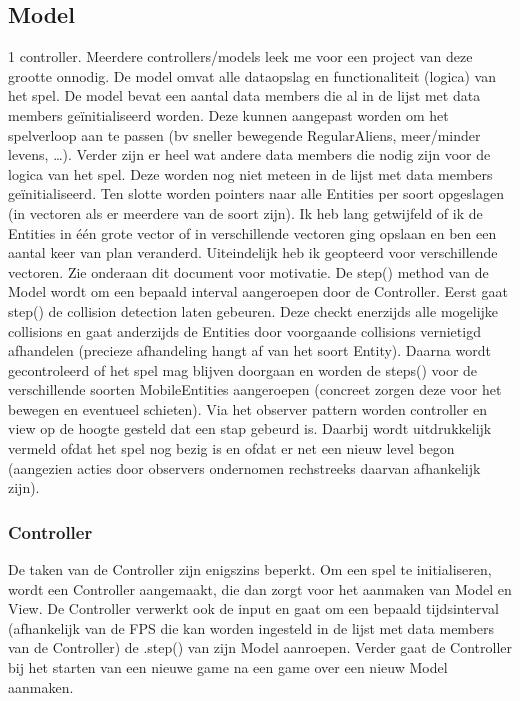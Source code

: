 \documentclass[11pt, a4paper]{article}
\begin{document}
\subsection{Model}
1 controller. Meerdere controllers/models leek me voor een project van deze grootte onnodig.
De model omvat alle dataopslag en functionaliteit (logica) van het spel. De model bevat een aantal data members die al in de lijst met data members geïnitialiseerd worden. Deze kunnen aangepast worden om het spelverloop aan te passen (bv sneller bewegende RegularAliens, meer/minder levens, …). Verder zijn er heel wat andere data members die nodig zijn voor de logica van het spel. Deze worden nog niet meteen in de lijst met data members geïnitialiseerd. Ten slotte worden pointers naar alle Entities per soort opgeslagen (in vectoren als er meerdere van de soort zijn). Ik heb lang getwijfeld of ik de Entities in één grote vector of in verschillende vectoren ging opslaan en ben een aantal keer van plan veranderd. Uiteindelijk heb ik geopteerd voor verschillende vectoren. Zie onderaan dit document voor motivatie.
De step() method van de Model wordt om een bepaald interval aangeroepen door de Controller. Eerst gaat step() de collision detection laten gebeuren. Deze checkt enerzijds alle mogelijke collisions en gaat anderzijds de Entities door voorgaande collisions vernietigd afhandelen (precieze afhandeling hangt af van het soort Entity). Daarna wordt gecontroleerd of het spel mag blijven doorgaan en worden de steps() voor de verschillende soorten MobileEntities aangeroepen (concreet zorgen deze voor het bewegen en eventueel schieten). Via het observer pattern worden controller en view op de hoogte gesteld dat een stap gebeurd is. Daarbij wordt uitdrukkelijk vermeld ofdat het spel nog bezig is en ofdat er net een nieuw level begon (aangezien acties door observers ondernomen rechstreeks daarvan afhankelijk zijn).
\subsubsection{Controller}
De taken van de Controller zijn enigszins beperkt. Om een spel te initialiseren, wordt een Controller aangemaakt, die dan zorgt voor het aanmaken van Model en View. De Controller verwerkt ook de input en gaat om een bepaald tijdsinterval (afhankelijk van de FPS die kan worden ingesteld in de lijst met data members van de Controller) de .step() van zijn Model aanroepen. Verder gaat de Controller bij het starten van een nieuwe game na een game over een nieuw Model aanmaken.
\end{document}
